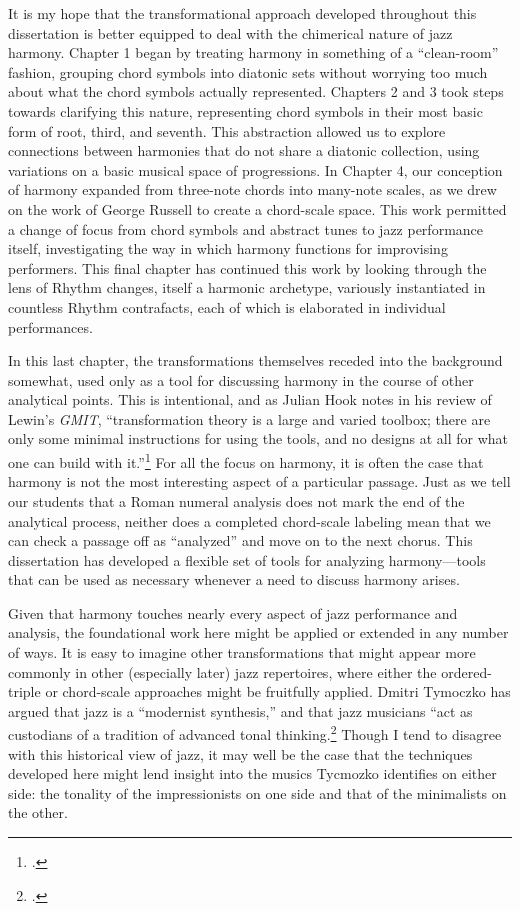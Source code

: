 It is my hope that the transformational approach developed throughout this
dissertation is better equipped to deal with the chimerical nature of jazz
harmony. Chapter 1 began by treating harmony in something of a ``clean-room''
fashion, grouping chord symbols into diatonic sets without worrying too much
about what the chord symbols actually represented. Chapters 2 and 3 took steps
towards clarifying this nature, representing chord symbols in their most basic
form of root, third, and seventh. This abstraction allowed us to explore
connections between harmonies that do not share a diatonic collection, using
variations on a basic musical space of \tfo progressions. In Chapter 4, our
conception of harmony expanded from three-note chords into many-note scales,
as we drew on the work of George Russell to create a chord-scale space. This
work permitted a change of focus from chord symbols and abstract tunes to jazz
performance itself, investigating the way in which harmony functions for
improvising performers. This final chapter has continued this work by looking
through the lens of Rhythm changes, itself a harmonic archetype, variously
instantiated in countless Rhythm contrafacts, each of which is elaborated in
individual performances.

In this last chapter, the transformations themselves receded into the
background somewhat, used only as a tool for discussing harmony in the course
of other analytical points. This is intentional, and as Julian Hook notes in
his review of Lewin's \emph{GMIT}, ``transformation theory is a large and
varied toolbox; there are only some minimal instructions for using the tools,
and no designs at all for what one can build with
it.''\footcite[166]{hook:2007gmit} For all the focus on harmony, it is often
the case that harmony is not the most interesting aspect of a particular
passage. Just as we tell our students that a Roman numeral analysis does not
mark the end of the analytical process, neither does a completed chord-scale
labeling mean that we can check a passage off as ``analyzed'' and move on to
the next chorus. This dissertation has developed a flexible set of tools for
analyzing harmony---\allowbreak tools that can be used as necessary whenever a
need to discuss harmony arises.

Given that harmony touches nearly every aspect of jazz performance and
analysis, the foundational work here might be applied or extended in any
number of ways. It is easy to imagine other transformations that might appear
more commonly in other (especially later) jazz repertoires, where either the
ordered-triple or chord-scale approaches might be fruitfully applied. Dmitri
Tymoczko has argued that jazz is a ``modernist synthesis,'' and that jazz
musicians ``act as custodians of a tradition of advanced tonal
thinking.\footcite[389]{tymoczko:2011} Though I tend to disagree with
this historical view of jazz, it may well be the case that the techniques
developed here might lend insight into the musics Tycmozko identifies on
either side: the tonality of the impressionists on one side and that of the
minimalists on the other.

